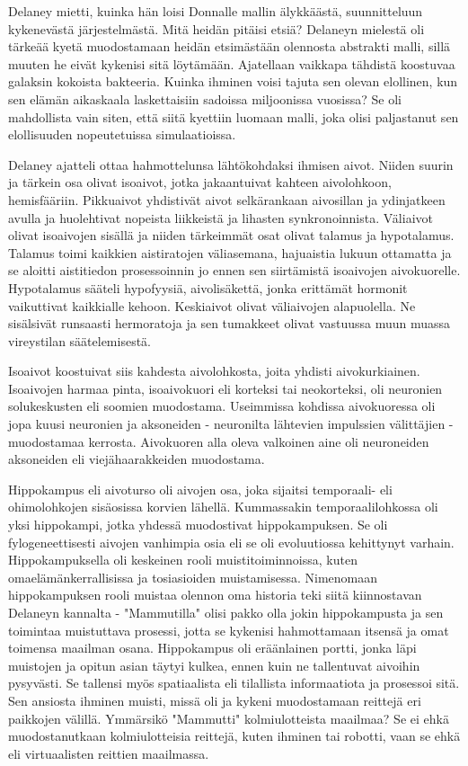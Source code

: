 \psep Delaney mietti, kuinka hän loisi Donnalle mallin älykkäästä, suunnitteluun kykenevästä järjestelmästä. Mitä heidän pitäisi etsiä? Delaneyn mielestä oli tärkeää kyetä muodostamaan heidän etsimästään olennosta abstrakti malli, sillä muuten he eivät kykenisi sitä löytämään. Ajatellaan vaikkapa tähdistä koostuvaa galaksin kokoista bakteeria. Kuinka ihminen voisi tajuta sen olevan elollinen, kun sen elämän aikaskaala laskettaisiin sadoissa miljoonissa vuosissa? Se oli mahdollista vain siten, että siitä kyettiin luomaan malli, joka olisi paljastanut sen elollisuuden nopeutetuissa simulaatioissa.


Delaney ajatteli ottaa hahmottelunsa lähtökohdaksi ihmisen aivot. Niiden suurin ja tärkein osa olivat isoaivot, jotka jakaantuivat kahteen aivolohkoon, hemisfääriin. Pikkuaivot yhdistivät aivot selkärankaan aivosillan ja ydinjatkeen avulla ja huolehtivat nopeista liikkeistä ja lihasten synkronoinnista. Väliaivot olivat isoaivojen sisällä ja niiden tärkeimmät osat olivat talamus ja hypotalamus. Talamus toimi kaikkien aistiratojen väliasemana, hajuaistia lukuun ottamatta ja se aloitti aistitiedon prosessoinnin jo ennen sen siirtämistä isoaivojen aivokuorelle. Hypotalamus sääteli hypofyysiä, aivolisäkettä, jonka erittämät hormonit vaikuttivat kaikkialle kehoon. Keskiaivot olivat väliaivojen alapuolella. Ne sisälsivät runsaasti hermoratoja ja sen tumakkeet olivat vastuussa muun muassa vireystilan säätelemisestä.


Isoaivot koostuivat siis kahdesta aivolohkosta, joita yhdisti aivokurkiainen. Isoaivojen harmaa pinta, isoaivokuori eli korteksi tai neokorteksi, oli neuronien solukeskusten eli soomien muodostama. Useimmissa kohdissa aivokuoressa oli jopa kuusi neuronien ja aksoneiden - neuronilta lähtevien impulssien välittäjien - muodostamaa kerrosta. Aivokuoren alla oleva valkoinen aine oli neuroneiden aksoneiden eli viejähaarakkeiden muodostama.


Hippokampus eli aivoturso oli aivojen osa, joka sijaitsi temporaali- eli ohimolohkojen sisäosissa korvien lähellä. Kummassakin temporaalilohkossa oli yksi hippokampi, jotka yhdessä muodostivat hippokampuksen. Se oli fylogeneettisesti aivojen vanhimpia osia eli se oli evoluutiossa kehittynyt varhain. Hippokampuksella oli keskeinen rooli muistitoiminnoissa, kuten omaelämänkerrallisissa ja tosiasioiden muistamisessa. Nimenomaan hippokampuksen rooli muistaa olennon oma historia teki siitä kiinnostavan Delaneyn kannalta - "Mammutilla" olisi pakko olla jokin hippokampusta ja sen toimintaa muistuttava prosessi, jotta se kykenisi hahmottamaan itsensä ja omat toimensa maailman osana. Hippokampus oli eräänlainen portti, jonka läpi muistojen ja opitun asian täytyi kulkea, ennen kuin ne tallentuvat aivoihin pysyvästi. Se tallensi myös spatiaalista eli tilallista informaatiota ja prosessoi sitä. Sen ansiosta ihminen muisti, missä oli ja kykeni muodostamaan reittejä eri paikkojen välillä. Ymmärsikö "Mammutti" kolmiulotteista maailmaa? Se ei ehkä muodostanutkaan kolmiulotteisia reittejä, kuten ihminen tai robotti, vaan se ehkä eli virtuaalisten reittien maailmassa.


